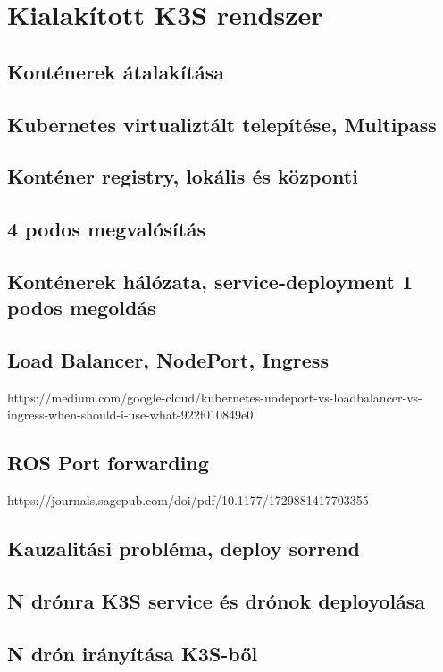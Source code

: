 \chapter{Kialakított K3S rendszer}

\section{Konténerek átalakítása}

\section{Kubernetes virtualiztált telepítése, Multipass}

\section{Konténer registry, lokális és központi}

\section{4 podos megvalósítás}

\section{Konténerek hálózata, service-deployment 1 podos megoldás}

\section{Load Balancer, NodePort, Ingress}
https://medium.com/google-cloud/kubernetes-nodeport-vs-loadbalancer-vs-ingress-when-should-i-use-what-922f010849e0

\section{ROS Port forwarding}
https://journals.sagepub.com/doi/pdf/10.1177/1729881417703355

\section{Kauzalitási probléma, deploy sorrend}

\section{N drónra K3S service és drónok deployolása}

\section{N drón irányítása K3S-ből}
